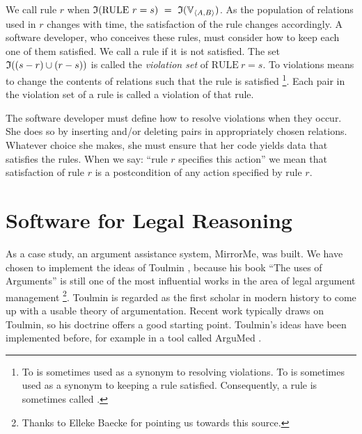 \documentclass{svproc}
\begin{document}
	We call rule $r$  when $\ti{\text{RULE}\ r = s}\ =\ \ti{\fullt{A}{B}}$.
	As the population of relations used in $r$ changes with time, the satisfaction of the rule changes accordingly.
	A software developer, who conceives these rules, must consider how to keep each one of them satisfied.
	We call a rule  if it is not satisfied.
	The set $\mathfrak{I}((s-r)\cup(r-s))$ is called the \emph{violation set} of \(\text{RULE}\ r = s\).
	To  violations means to change the contents of relations such that the rule is satisfied%
\footnote{To  is sometimes used as a synonym to resolving violations.
	To  is sometimes used as a synonym to keeping a rule satisfied.
	Consequently, a rule is sometimes called .}.
	Each pair in the violation set of a rule is called a violation of that rule.

	The software developer must define how to resolve violations when they occur.
	She does so by inserting and/or deleting pairs in appropriately chosen relations.
	Whatever choice she makes, she must ensure that her code yields data that satisfies the rules.
	When we say: ``rule $r$ specifies this action'' we mean that satisfaction of rule $r$ is a postcondition of any action specified by rule $r$. 

\section{Software for Legal Reasoning}
\label{sct:Conceptual analysis}
	As a case study, an argument assistance system, MirrorMe, was built.
	We have chosen to implement the ideas of Toulmin \cite{Toulmin1958},
	because his book ``The uses of Arguments'' is still one of the most influential works in the area of legal argument management%
\footnote{Thanks to Elleke Baecke for pointing us towards this source.}.
	Toulmin is regarded as the first scholar in modern history to come up with a usable theory of argumentation.
	Recent work typically draws on Toulmin, so his doctrine offers a good starting point.
	Toulmin's ideas have been implemented before, for example in a tool called ArguMed \cite{Verheij1999}.
\end{document}
